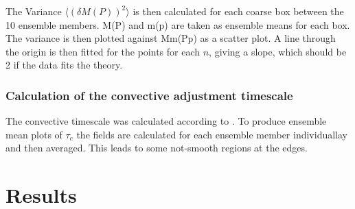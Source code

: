 \documentclass[a4paper, 12pt]{article}
\begin{document}
The Variance $\langle (\delta M(P))^2 \rangle$ is then calculated for each coarse box between the 10 ensemble members. M(P) and m(p) are taken as ensemble means for each box. The variance is then plotted against Mm(Pp) as a scatter plot. A line through the origin is then fitted for the points for each $n$, giving a slope, which should be 2 if the data fits the theory. 


\subsubsection{Calculation of the convective adjustment timescale}
The convective timescale was calculated according to \cite{Flack2016}. To produce ensemble mean plots of $\tau_c$ the fields are calculated for each ensemble member individuallay and then averaged. This leads to some not-smooth regions at the edges. 

\section{Results}




{\small
 }
\end{document}
